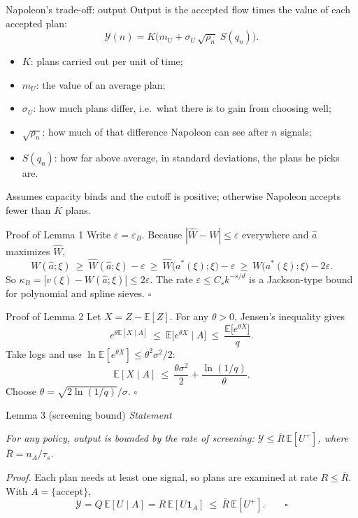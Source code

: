 \documentclass[aspectratio=169,11pt,t]{beamer}
\newcommand{\Nap}{\textcolor{nap}{Napoleon}}
\newcommand{\tN}[1]{\textcolor{nap}{\textbf{#1}}}
\newcommand{\head}[2][ink]{{\itshape\color{#1}#2}\par\vspace{0.15cm}}
\newcommand{\aside}[1]{{\small\color{muted}#1\par}}
\newcommand{\E}{\mathbb{E}}
\newcommand{\Ycal}{\mathcal{Y}}
\begin{document}
\begin{frame}{\Nap's trade-off: output}
  Output is the accepted flow times the value of each accepted plan:
  \[\Ycal(n)=K\Big(m_U+\sigma_U\,\sqrt{\rho_n}\;S(q_n)\Big).\]
  \begin{itemize}\setlength{\itemsep}{2pt}
    \item $K$: plans carried out per unit of time;
    \item $m_U$: the value of an average plan;
    \item $\sigma_U$: how much plans differ, i.e.\ what there is to gain from choosing well;
    \item \tN{$\sqrt{\rho_n}$}: how much of that difference Napoleon can see after $n$ signals;
    \item \tN{$S(q_n)$}: how far above average, in standard deviations, the plans he picks are.
  \end{itemize}
  \aside{Assumes capacity binds and the cutoff is positive; otherwise Napoleon accepts fewer than $K$ plans.}
\end{frame}

\begin{frame}{Proof of Lemma 1}
  Write $\varepsilon=\varepsilon_B$. Because $|\hat W-W|\le\varepsilon$ everywhere and $\hat a$ maximizes $\hat W$,
  \[W(\hat a;\xi)\ \ge\ \hat W(\hat a;\xi)-\varepsilon\ \ge\ \hat W\big(a^*(\xi);\xi\big)-\varepsilon\ \ge\ W\big(a^*(\xi);\xi\big)-2\varepsilon.\]
  So $\kappa_B=|v(\xi)-W(\hat a;\xi)|\le2\varepsilon$. The rate $\varepsilon\le C_sk^{-s/d}$ is a Jackson-type bound for polynomial and spline sieves. \hfill$\square$
\end{frame}

\begin{frame}{Proof of Lemma 2}
  Let $X=Z-\E[Z]$. For any $\theta>0$, Jensen's inequality gives
  \[e^{\theta\E[X\mid A]}\ \le\ \E\big[e^{\theta X}\mid A\big]\ \le\ \frac{\E\big[e^{\theta X}\big]}{q}.\]
  Take logs and use $\ln\E[e^{\theta X}]\le\theta^2\sigma^2/2$:
  \[\E[X\mid A]\ \le\ \frac{\theta\sigma^2}{2}+\frac{\ln(1/q)}{\theta}.\]
  Choose $\theta=\sqrt{2\ln(1/q)}/\sigma$. \hfill$\square$
\end{frame}

\begin{frame}{Lemma 3 (screening bound)}
  \head{Statement}
  {\itshape For any policy, output is bounded by the rate of screening: $\Ycal\le\bar R\,\E[U^+]$, where $\bar R=n_A/\tau_s$.}
  \vspace{0.4cm}

  \emph{Proof.} Each plan needs at least one signal, so plans are examined at rate $R\le\bar R$. With $A=\{\text{accept}\}$,
  \[\Ycal=Q\,\E[U\mid A]=R\,\E[U\mathbf{1}_A]\ \le\ \bar R\,\E[U^+].\qquad\square\]
\end{frame}
\end{document}
